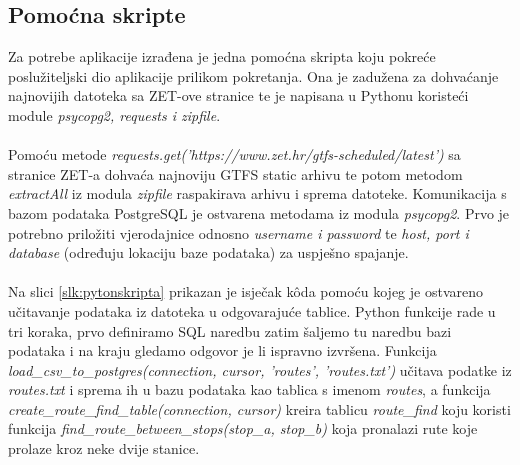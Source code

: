 \documentclass[zavrsnirad]{fer}
\begin{document}
\subsection{Pomoćna skripte}
\label{sec:skripta}
Za potrebe aplikacije izrađena je jedna pomoćna skripta koju pokreće poslužiteljski dio aplikacije prilikom pokretanja. Ona je zadužena za dohvaćanje najnovijih datoteka sa ZET-ove stranice te je napisana u Pythonu koristeći module \textit{psycopg2, requests i zipfile}.\\\\
Pomoću metode \textit{requests.get('https://www.zet.hr/gtfs-scheduled/latest')} sa stranice ZET-a dohvaća najnoviju GTFS static arhivu te potom metodom \textit{extractAll} iz modula \textit{zipfile} raspakirava arhivu i sprema datoteke. Komunikacija s bazom podataka PostgreSQL je ostvarena metodama iz modula \textit{psycopg2}. Prvo je potrebno priložiti vjerodajnice odnosno \textit{username i password} te \textit{host, port i database} (određuju lokaciju baze podataka) za uspješno spajanje.\\\\
Na slici \ref{slk:pytonskripta} prikazan je isječak k\^oda pomoću kojeg je ostvareno učitavanje podataka iz datoteka u odgovarajuće tablice. Python funkcije rade u tri koraka, prvo definiramo SQL naredbu zatim šaljemo tu naredbu bazi podataka i na kraju gledamo odgovor je li ispravno izvršena. Funkcija \textit{load\_csv\_to\_postgres(connection, cursor, 'routes', 'routes.txt')} učitava podatke iz \textit{routes.txt}  i sprema ih u bazu podataka kao tablica s imenom \textit{routes}, a funkcija \textit{create\_route\_find\_table(connection, cursor)} kreira tablicu \textit{route\_find} koju koristi funkcija \textit{find\_route\_between\_stops(stop\_a, stop\_b)} koja pronalazi rute koje prolaze kroz neke dvije stanice.
\end{document}
